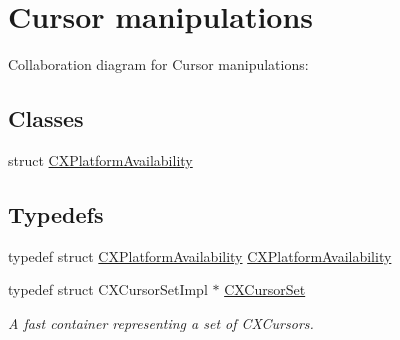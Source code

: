 \hypertarget{group__CINDEX__CURSOR__MANIP}{}\section{Cursor manipulations}
\label{group__CINDEX__CURSOR__MANIP}
Collaboration diagram for Cursor manipulations\+:
\subsection*{Classes}
\begin{DoxyCompactItemize}
\item 
struct \hyperlink{structCXPlatformAvailability}{C\+X\+Platform\+Availability}
\end{DoxyCompactItemize}
\subsection*{Typedefs}
\begin{DoxyCompactItemize}
\item 
typedef struct \hyperlink{structCXPlatformAvailability}{C\+X\+Platform\+Availability} \hyperlink{group__CINDEX__CURSOR__MANIP_ga0b3c1f89b3a9bf57c567884e7ebe41c4}{C\+X\+Platform\+Availability}
\item 
\mbox{\label{group__CINDEX__CURSOR__MANIP_gacca741976831fc313f80970cbf88307d}} 
typedef struct C\+X\+Cursor\+Set\+Impl $\ast$ \hyperlink{group__CINDEX__CURSOR__MANIP_gacca741976831fc313f80970cbf88307d}{C\+X\+Cursor\+Set}
\begin{DoxyCompactList}\small\item\em A fast container representing a set of C\+X\+Cursors. \end{DoxyCompactList}\end{DoxyCompactItemize}
